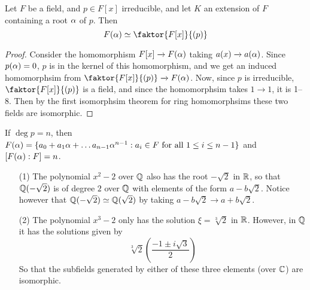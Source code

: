 \begin{theorem}\label{theorem_8.1.8}
  Let $F$ be a field, and  $p \in F[x]$ irreducible, and let $K$ an extension
  of  $F$ containing a root $\alpha$ of $p$. Then
  \begin{equation*}
    F(\a) \simeq \faktor{F[x]}{(p)}
  \end{equation*}
\end{theorem}
\begin{proof}
  Consider the homomorphism $F[x] \xrightarrow{} F(\alpha)$ taking $a(x) \xrightarrow{}
  a(\alpha)$. Since  $p(\alpha)=0$, $p$ is in the kernel of this homomorphism, and we
  get an induced homomorphsim from $\faktor{F[x]}{(p)} \xrightarrow{} F(\a)$.
  Now, since $p$ is irreducible,  $\faktor{F[x]}{(p)}$ is a field, and since
  the homomorphsim takes $1 \xrightarrow{} 1$, it is 1--8. Then by the first
  isomorphsim theorem for ring homomorphsims these two fields are isomorphic.
\end{proof}
\begin{corollary}
  If $\deg{p}=n$, then $F(\alpha)=\{a_0+a_1\alpha+\dots a_{n-1}\alpha^{n-1} : a_i \in F
  \text{ for all } 1 \leq i \leq n-1\}$ and $[F(\alpha) : F]=n$.
\end{corollary}

\begin{example}\label{example_8.4}
  \begin{enumerate}
    \item[(1)] The polynomial $x^2-2$ over  $\mathbb{Q}$ also has the root
      $-\sqrt{2}$ in $\mathbb{R}$, so that $\mathbb{Q}(-\sqrt{2})$ is of degree $2$ over
      $\mathbb{Q}$ with elements of the form  $a-b\sqrt{2}$. Notice however that
      $\mathbb{Q}(-\sqrt{2}) \simeq \mathbb{Q}(\sqrt{2})$ by taking $a-b\sqrt{2}
      \xrightarrow{} a+b\sqrt{2}$.

    \item[(2)] The polynomial $x^3-2$ only has the solution
      $\xi=\sqrt[3]{2}$ in $\mathbb{R}$. However, in  $\mathbb{Q}$ it has the solutions
      given by
      \begin{equation*}
        \sqrt[3]{2}(\frac{-1 \pm i\sqrt{3}}{2})
      \end{equation*}
      So that the subfields generated by either of these three elements
      (over $\mathbb{C}$) are isomorphic.
  \end{enumerate}
\end{example}

